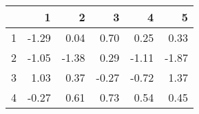 \begin{table}[ht]
\centering
\begin{tabular}{rrrrrr}
  \hline
 & 1 & 2 & 3 & 4 & 5 \\ 
  \hline
1 & -1.29 & 0.04 & 0.70 & 0.25 & 0.33 \\ 
  2 & -1.05 & -1.38 & 0.29 & -1.11 & -1.87 \\ 
  3 & 1.03 & 0.37 & -0.27 & -0.72 & 1.37 \\ 
  4 & -0.27 & 0.61 & 0.73 & 0.54 & 0.45 \\ 
   \hline
\end{tabular}
\end{table}
